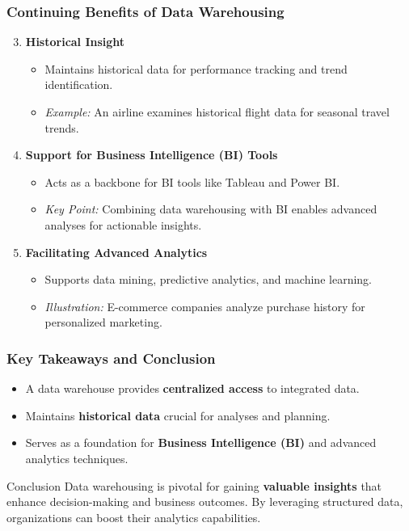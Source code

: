 \documentclass{beamer}
\begin{document}
\begin{frame}[fragile]
    \frametitle{Continuing Benefits of Data Warehousing}
    \begin{enumerate}\setcounter{enumi}{2}
        \item \textbf{Historical Insight}
        \begin{itemize}
            \item Maintains historical data for performance tracking and trend identification.
            \item \textit{Example:} An airline examines historical flight data for seasonal travel trends.
        \end{itemize}
        
        \item \textbf{Support for Business Intelligence (BI) Tools}
        \begin{itemize}
            \item Acts as a backbone for BI tools like Tableau and Power BI.
            \item \textit{Key Point:} Combining data warehousing with BI enables advanced analyses for actionable insights.
        \end{itemize}
        
        \item \textbf{Facilitating Advanced Analytics}
        \begin{itemize}
            \item Supports data mining, predictive analytics, and machine learning.
            \item \textit{Illustration:} E-commerce companies analyze purchase history for personalized marketing.
        \end{itemize}
    \end{enumerate}
\end{frame}

\begin{frame}[fragile]
    \frametitle{Key Takeaways and Conclusion}
    \begin{itemize}
        \item A data warehouse provides \textbf{centralized access} to integrated data.
        \item Maintains \textbf{historical data} crucial for analyses and planning.
        \item Serves as a foundation for \textbf{Business Intelligence (BI)} and advanced analytics techniques.
    \end{itemize}

    \begin{block}{Conclusion}
        Data warehousing is pivotal for gaining \textbf{valuable insights} that enhance decision-making and business outcomes. By leveraging structured data, organizations can boost their analytics capabilities.
    \end{block}
\end{frame}
\end{document}
